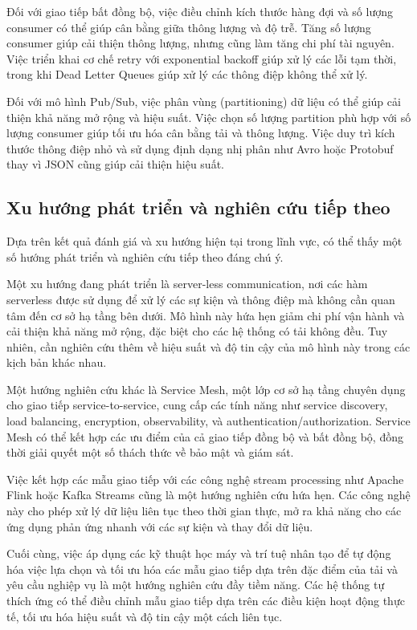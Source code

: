 Đối với giao tiếp bất đồng bộ, việc điều chỉnh kích thước hàng đợi và số lượng consumer có thể giúp cân bằng giữa thông lượng và độ trễ. Tăng số lượng consumer giúp cải thiện thông lượng, nhưng cũng làm tăng chi phí tài nguyên. Việc triển khai cơ chế retry với exponential backoff giúp xử lý các lỗi tạm thời, trong khi Dead Letter Queues giúp xử lý các thông điệp không thể xử lý.

Đối với mô hình Pub/Sub, việc phân vùng (partitioning) dữ liệu có thể giúp cải thiện khả năng mở rộng và hiệu suất. Việc chọn số lượng partition phù hợp với số lượng consumer giúp tối ưu hóa cân bằng tải và thông lượng. Việc duy trì kích thước thông điệp nhỏ và sử dụng định dạng nhị phân như Avro hoặc Protobuf thay vì JSON cũng giúp cải thiện hiệu suất.

\subsection{Xu hướng phát triển và nghiên cứu tiếp theo}
Dựa trên kết quả đánh giá và xu hướng hiện tại trong lĩnh vực, có thể thấy một số hướng phát triển và nghiên cứu tiếp theo đáng chú ý.

Một xu hướng đang phát triển là server-less communication, nơi các hàm serverless được sử dụng để xử lý các sự kiện và thông điệp mà không cần quan tâm đến cơ sở hạ tầng bên dưới. Mô hình này hứa hẹn giảm chi phí vận hành và cải thiện khả năng mở rộng, đặc biệt cho các hệ thống có tải không đều. Tuy nhiên, cần nghiên cứu thêm về hiệu suất và độ tin cậy của mô hình này trong các kịch bản khác nhau.

Một hướng nghiên cứu khác là Service Mesh, một lớp cơ sở hạ tầng chuyên dụng cho giao tiếp service-to-service, cung cấp các tính năng như service discovery, load balancing, encryption, observability, và authentication/authorization. Service Mesh có thể kết hợp các ưu điểm của cả giao tiếp đồng bộ và bất đồng bộ, đồng thời giải quyết một số thách thức về bảo mật và giám sát.

Việc kết hợp các mẫu giao tiếp với các công nghệ stream processing như Apache Flink hoặc Kafka Streams cũng là một hướng nghiên cứu hứa hẹn. Các công nghệ này cho phép xử lý dữ liệu liên tục theo thời gian thực, mở ra khả năng cho các ứng dụng phản ứng nhanh với các sự kiện và thay đổi dữ liệu.

Cuối cùng, việc áp dụng các kỹ thuật học máy và trí tuệ nhân tạo để tự động hóa việc lựa chọn và tối ưu hóa các mẫu giao tiếp dựa trên đặc điểm của tải và yêu cầu nghiệp vụ là một hướng nghiên cứu đầy tiềm năng. Các hệ thống tự thích ứng có thể điều chỉnh mẫu giao tiếp dựa trên các điều kiện hoạt động thực tế, tối ưu hóa hiệu suất và độ tin cậy một cách liên tục.

